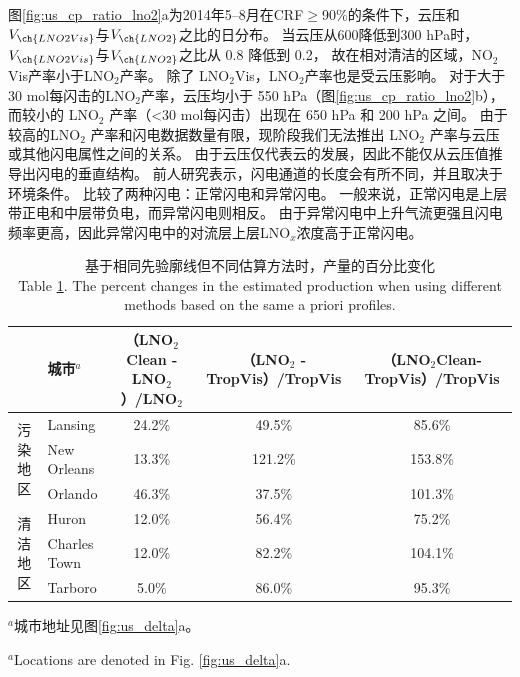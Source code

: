 图\ref{fig:us_cp_ratio_lno2}a为2014年5--8月在CRF$\geq$90\%的条件下，云压和$V_{\ch{LNO2Vis}}$与$V_{\ch{LNO2}}$之比的日分布。
当云压从600降低到300 hPa时，$V_{\ch{LNO2Vis}}$与$V_{\ch{LNO2}}$之比从 0.8 降低到 0.2，
故在相对清洁的区域，NO$_2$Vis产率小于LNO$_2$产率。
除了 LNO$_2$Vis，LNO$_2$产率也是受云压影响。
对于大于 30 mol每闪击的LNO$_2$产率，云压均小于 550 hPa（图\ref{fig:us_cp_ratio_lno2}b），
而较小的 LNO$_2$ 产率（<30 mol每闪击）出现在 650 hPa 和 200 hPa 之间。
由于较高的LNO$_2$ 产率和闪电数据数量有限，现阶段我们无法推出 LNO$_2$ 产率与云压或其他闪电属性之间的关系。
由于云压仅代表云的发展，因此不能仅从云压值推导出闪电的垂直结构。
前人研究表示，闪电通道的长度会有所不同，并且取决于环境条件\citep{Carey.2016,Mecikalski.2017,Fuchs.2018}。
\citet{Davis.2019}比较了两种闪电：正常闪电和异常闪电。
一般来说，正常闪电是上层带正电和中层带负电，而异常闪电则相反\citep{Williams.1989}。
由于异常闪电中上升气流更强且闪电频率更高，因此异常闪电中的对流层上层LNO$_x$浓度高于正常闪电。



\begin{table}[H]
\caption{基于相同先验廓线但不同估算方法时，产量的百分比变化\\Table \ref{table:production_comp}. The percent changes in the estimated production when using different methods based on the same a priori profiles.}
\scriptsize
\centering
\begin{tabular}{clccc}
\hline
 & 城市$^a$ & （LNO$_2$Clean - LNO$_2$）/LNO$_2$ & （LNO$_2$ - TropVis）/TropVis & （LNO$_2$Clean-TropVis）/TropVis \\
\hline
\multirow{3}{*}{污染地区} & Lansing          & 24.2\%  & 49.5\%   & 85.6\%   \\
                         & New Orleans      & 13.3\%  & 121.2\%  & 153.8\%  \\
                         & Orlando          & 46.3\%  & 37.5\%   & 101.3\%  \\
\hline
\multirow{3}{*}{清洁地区}    & Huron            & 12.0\%  & 56.4\%   & 75.2\%   \\
                            & Charles Town     & 12.0\%  & 82.2\%   & 104.1\%  \\
                            & Tarboro          & 5.0\%   & 86.0\%   & 95.3\%   \\
\hline
\end{tabular}
\begin{tablenotes}
\linespread{1}\footnotesize
\item $^a$城市地址见图\ref{fig:us_delta}a。
\item $^a$Locations are denoted in Fig. \ref{fig:us_delta}a.
\end{tablenotes}
\label{table:production_comp}
\end{table}

